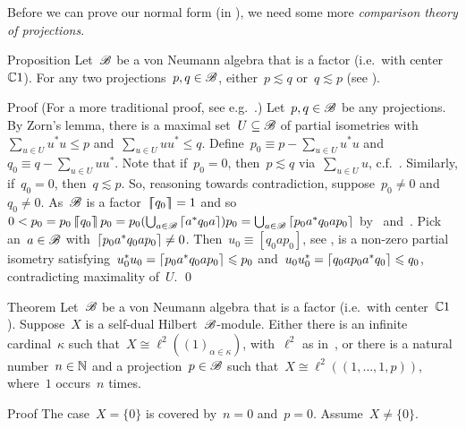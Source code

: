 \documentclass[b]{subfiles}
\begin{document}
\begin{parsec}%
\begin{point}%
Before we can prove our normal form (in ),
    we need some more \emph{comparison theory of projections}.
\end{point}
\begin{point}{Proposition}%
Let~$\mathscr{B}$ be a von Neumann algebra that is a factor (i.e.~with center~$\mathbb{C} 1$).
For any two projections~$p,q \in \mathscr{B}$,
    either~$p \lesssim q$ or~$q \lesssim p$ (see ).
\begin{point}{Proof}%
(For a more traditional proof, see e.g.~\cite[Prop.~6.2.4]{kr}.)
Let~$p,q \in \mathscr{B}$ be any projections.
By Zorn's lemma, there is a maximal
    set~$U\subseteq \mathscr{B}$ of partial isometries
    with~$\sum_{u\in U} u^*u \leq p$
    and~$\sum_{u\in U} uu^* \leq q$.
Define~$p_0 \equiv p - \sum_{u\in U} u^*u$
    and~$q_0 \equiv q - \sum_{u \in U} uu^*$.
Note that if~$p_0 = 0$, then~$p \lesssim q$
    via~$\sum_{u \in U} u$, c.f.~.
Similarly, if~$q_0 = 0$, then~$q \lesssim p$.
So, reasoning towards contradiction,
    suppose~$p_0 \neq 0$ and~$q_0 \neq 0$.
As~$\mathscr{B}$ is a factor~$\left\lceil\!\!\left\lceil q_0\right\rceil\!\!\right\rceil = 1$
    and so~$0 < p_0 = p_0\left\lceil\!\!\left\lceil q_0\right\rceil\!\!\right\rceil p_0 = p_0 (\bigcup_{a \in \mathscr{B}} \left\lceil a^* q_0 a \right\rceil) p_0
                = \bigcup_{a \in \mathscr{B}} \left\lceil p_0a^*q_0ap_0\right\rceil$
            by~ and~.
Pick an~$a \in \mathscr{B}$ with~$\left\lceil p_0a^*q_0ap_0\right\rceil \neq 0$.
Then~$u_0 \equiv [q_0ap_0]$, see ,
    is a non-zero partial isometry
    satisfying~$u_0^*u_0 = \left\lceil p_0a^*q_0ap_0\right\rceil \leqslant p_0$
    and~$u_0 u_0^* = \left\lceil q_0ap_0a^*q_0\right\rceil \leqslant q_0$,
    contradicting maximality of~$U$. \qed
\end{point}
\end{point}
\begin{point}{Theorem}%
Let~$\mathscr{B}$ be a von Neumann algebra that is a factor (i.e.~with center~$\mathbb{C} 1$).
Suppose~$X$ is a self-dual Hilbert~$\mathscr{B}$-module.
Either there is an infinite cardinal~$\kappa$
    such that~$X \cong \ell^2((1)_{\alpha \in \kappa})$,
    with~$\ell^2$ as in~,
    or there is a natural number~$n\in \mathbb{N}$
    and a projection~$p \in \mathscr{B}$
    such that~$X \cong \ell^2((1, \ldots, 1, p))$,
    where~$1$ occurs~$n$ times.
\begin{point}{Proof}%
The case~$X = \{0\}$ is covered by~$n=0$ and~$p=0$.
Assume~$X \neq \{0\}$.
\begin{point}%

\end{point}
\end{point}
\end{point}
\end{parsec}
\end{document}
